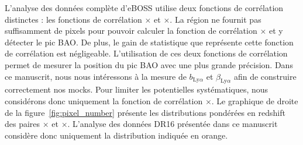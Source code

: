 \documentclass[11pt, twoside, a4paper, openright]{report}
\begin{document}
L'analyse \lya{} des données complète d'eBOSS \autocite{prov} utilise deux fonctions de corrélation distinctes : les fonctions de corrélation \lyalya{}$\times$\lyalya{} et \lyalya{}$\times$\lyalyb{}.
La région \lyb{} ne fournit pas suffisamment de pixels pour pouvoir calculer la fonction de corrélation \lyalyb{}$\times$\lyalyb{} et y détecter le pic BAO. De plus, le gain de statistique que représente cette fonction de corrélation est négligeable.
L'utilisation de ces deux fonctions de corrélation permet de mesurer la position du pic BAO avec une plus grande précision. Dans ce manuscrit, nous nous intéressons à la mesure de $b_{\mathrm{Ly}\alpha}$ et $\beta_{\mathrm{Ly}\alpha}$ afin de construire correctement nos mocks. Pour limiter les potentielles systématiques, nous considérons donc uniquement la fonction de corrélation \lyalya{}$\times$\lyalya{}.
Le graphique de droite de la figure~\ref{fig:pixel_number} présente les distributions pondérées en redshift des paires \lyalya{}$\times$\lyalya{} et \lyalya{}$\times$\lyalyb{}. L'analyse des données DR16 présentée dans ce manuscrit considère donc uniquement la distribution indiquée en orange.
\end{document}
